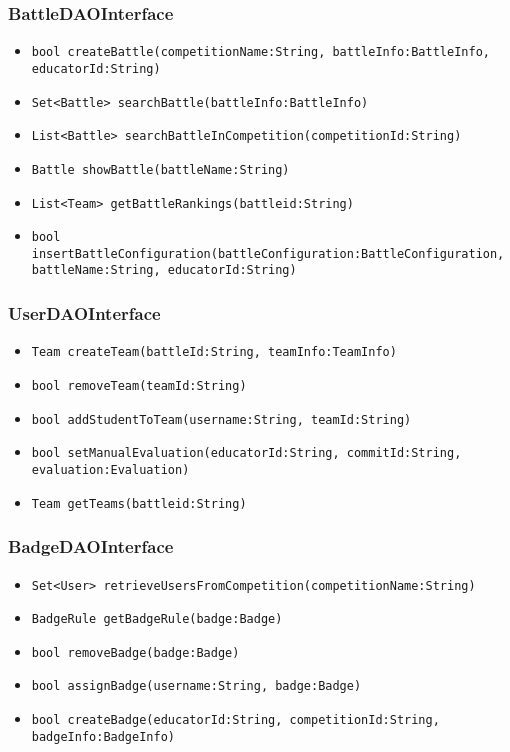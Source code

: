 \subsubsection{BattleDAOInterface}
\begin{itemize}
    \item \texttt{bool createBattle(competitionName:String, battleInfo:BattleInfo,\\educatorId:String)}%
    \item \texttt{Set<Battle> searchBattle(battleInfo:BattleInfo)}
    \item \texttt{List<Battle> searchBattleInCompetition(competitionId:String)}%
    \item \texttt{Battle showBattle(battleName:String)}
    \item \texttt{List<Team> getBattleRankings(battleid:String)}
    \item \texttt{bool insertBattleConfiguration(battleConfiguration:BattleConfiguration,\\battleName:String, educatorId:String)}%
\end{itemize}

\subsubsection{UserDAOInterface}
\begin{itemize}
    \item \texttt{Team createTeam(battleId:String, teamInfo:TeamInfo)}%
    \item \texttt{bool removeTeam(teamId:String)}
    \item \texttt{bool addStudentToTeam(username:String, teamId:String)}%
    \item \texttt{bool setManualEvaluation(educatorId:String, commitId:String,\\evaluation:Evaluation)}%
    \item \texttt{Team getTeams(battleid:String)}%
\end{itemize}

\subsubsection{BadgeDAOInterface}
\begin{itemize}
    \item \texttt{Set<User> retrieveUsersFromCompetition(competitionName:String)}
    \item \texttt{BadgeRule getBadgeRule(badge:Badge)}
    \item \texttt{bool removeBadge(badge:Badge)}
    \item \texttt{bool assignBadge(username:String, badge:Badge)}
    \item \texttt{bool createBadge(educatorId:String, competitionId:String, badgeInfo:BadgeInfo)}%
\end{itemize}

